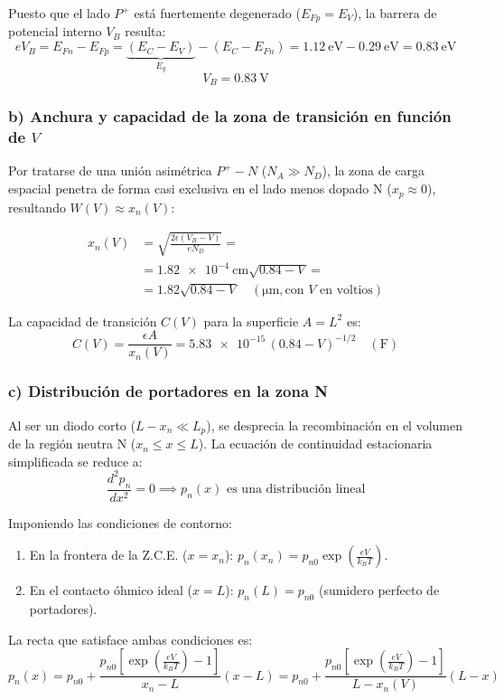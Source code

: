 \begin{problema}
Puesto que el lado $P^+$ está fuertemente degenerado ($E_{Fp} = E_V$), la barrera de potencial interno $V_B$ resulta:
\[
e V_B = E_{Fn} - E_{Fp} = \underbrace{(E_C - E_V)}_{E_g} - (E_C-E_{Fn}) = \SI{1.12}{\eV} - \SI{0.29}{\eV} = \SI{0.83}{\eV}
\]
\[
V_B = \SI{0.83}{\V}
\]

\subsubsection*{b) Anchura y capacidad de la zona de transición en función de $V$}

Por tratarse de una unión asimétrica $P^+-N$ ($N_A \gg N_D$), la zona de carga espacial penetra de forma casi exclusiva en el lado menos dopado N ($x_p \approx 0$), resultando $W(V) \approx x_n(V)$:

\begin{align*}
    x_n(V) & = \sqrt{\frac{2\epsilon (V_B - V)}{e N_D}} = \\[8pt]
    & = \SI{1.82e-4}{\cm} \sqrt{0.84 - V} = \\[8pt]
    & = 1.82 \sqrt{0.84 - V} \quad (\si{\um}, \text{con } V \text{ en voltios})
\end{align*}

La capacidad de transición $C(V)$ para la superficie $A = L^2$ es:
\[
C(V) = \frac{\epsilon A}{x_n(V)}= \num{5.83e-15}\,(0.84 - V)^{-1/2} \quad (\si{\farad})
\]

\subsubsection*{c) Distribución de portadores en la zona N}

Al ser un diodo corto ($L - x_n \ll L_p$), se desprecia la recombinación en el volumen de la región neutra N ($x_n \le x \le L$). La ecuación de continuidad estacionaria simplificada se reduce a:
\[
\frac{d^2 p_n}{dx^2} = 0 \implies p_n(x) \text{ es una distribución lineal}
\]

Imponiendo las condiciones de contorno:
\begin{enumerate}
    \item En la frontera de la Z.C.E. ($x = x_n$): $p_n(x_n) = p_{n0} \exp\left(\frac{e V}{k_B T}\right)$.
    \item En el contacto óhmico ideal ($x = L$): $p_n(L) = p_{n0}$ (sumidero perfecto de portadores).
\end{enumerate}

La recta que satisface ambas condiciones es:
\[
p_n(x) = p_{n0} + \frac{p_{n0}\left[\exp\left(\frac{e V}{k_B T}\right) - 1\right]}{x_n - L} (x - L) = p_{n0} + \frac{p_{n0}\left[\exp\left(\frac{e V}{k_B T}\right) - 1\right]}{L - x_n(V)} (L - x)
\]


\end{problema}
